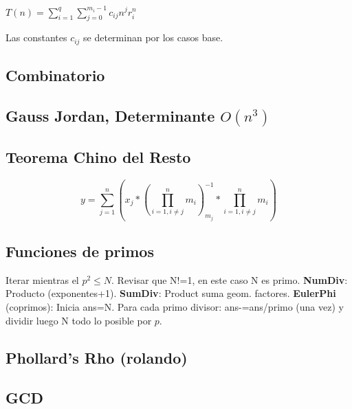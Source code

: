 $T(n)=\sum_{i=1}^q{\sum_{j=0}^{m_i - 1}c_{ij} n^j r_i^n}$

Las constantes $c_{ij}$ se determinan por los casos base.
\subsection{Combinatorio}
\subsection{Gauss Jordan, Determinante $O(n^3)$}
\subsection{Teorema Chino del Resto}
$$y=\sum_{j=1}^n (x_j*(\prod_{i=1, i\neq j}^n m_i)_{m_j}^{-1}*\prod_{i=1, i\neq j}^n m_i)$$
\subsection{Funciones de primos}
Iterar mientras el $p^2 \leq N$. Revisar que N!=1, en este caso N es primo.
\textbf{NumDiv}: Producto (exponentes+1). \textbf{SumDiv}: Product suma geom. factores. \textbf{EulerPhi} (coprimos): Inicia ans=N. Para cada primo divisor: ans-=ans/primo (una vez) y dividir luego N todo lo posible por $p$. 
\subsection{Phollard's Rho (rolando)}
\subsection{GCD}
